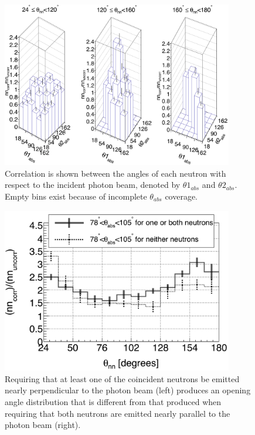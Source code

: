\begin{figure}
    \includegraphics[width = 0.9\textwidth]{Content/Results/theta_abs_LEGO.png}
    \caption{Correlation is shown between the angles of each neutron with respect to the incident photon beam, denoted by $\theta 1_{abs}$ and $\theta 2_{abs}$.
    Empty bins exist because of incomplete $\theta_{abs}$ coverage.}
    \label{fig:theta_abs_LEGO}
\end{figure}
\begin{figure}
\includegraphics[width=0.9\textwidth]{Content/Results/theta_abs_two-neutron.png}
\caption{Requiring that at least one of the coincident neutrons be emitted nearly perpendicular to the photon beam (left) produces an opening angle distribution that is different from that produced when requiring that both neutrons are emitted nearly parallel to the photon beam (right).}
\label{fig:theta_abs_two_neutron}
\end{figure}

\FloatBarrier 
